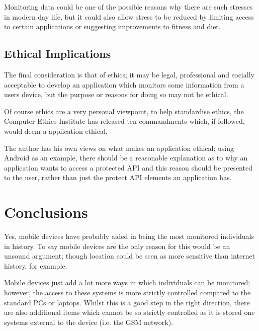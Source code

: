 \documentclass[12pt, a4paper]{article}
\begin{document}
Monitoring data could be one of the possible reasons why there are such
stresses in modern day life, but it could also allow stress to be reduced by
limiting access to certain applications or suggesting improvements to fitness
and diet.


\subsection{Ethical Implications}
The final consideration is that of ethics; it may be legal, professional and
socially acceptable to develop an application which monitors some information
from a users device, but the purpose or reasons for doing so may not be
ethical.

Of course ethics are a very personal viewpoint, to help standardise ethics, the
Computer Ethics Institute has released ten commandments\cite{ceiXcommandments} 
which, if followed, would deem a application ethical.

The author has his own views on what makes an application ethical; using Android
as an example, there should be a reasonable explanation as to why an
application wants to access a protected API and this reason should be presented
to the user, rather than just the protect API elements an application has.

\section{Conclusions}

Yes, mobile devices have probably aided in being the most monitored individuals
in history. To say mobile devices are the only reason for this would be an
unsound argument; though location could be seen as more sensitive than internet
history, for example.

Mobile devices just add a lot more ways in which individuals can be monitored;
however, the access to these systems is more strictly controlled compared to
the standard PCs or laptops. Whilst this is a good step in the right direction,
there are also additional items which cannot be so strictly controlled as it is
stored one systems external to the device (i.e. the \gls{GSM} network).

\newpage


\end{document}
